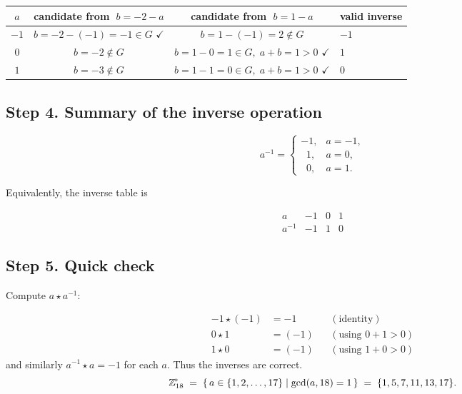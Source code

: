 \documentclass[12pt]{article}
\theoremstyle{definition} %
\theoremstyle{plain} %
\begin{document}
\begin{center}
\renewcommand{\arraystretch}{1.3}
\begin{tabular}{c|ccl}
\(a\) & candidate from \(\;b=-2-a\) &
candidate from \(\;b=1-a\) & valid inverse \\ \hline
\(-1\) & \(b=-2-(-1)=-1\in G\) \(\checkmark\) & \(b=1-(-1)=2\notin G\) & \(-1\) \\[2pt]
\(0\)  & \(b=-2\notin G\) & \(b=1-0=1\in G,\;a+b=1>0\) \(\checkmark\) & \(1\) \\[2pt]
\(1\)  & \(b=-3\notin G\) & \(b=1-1=0\in G,\;a+b=1>0\) \(\checkmark\) & \(0\)
\end{tabular}
\end{center}

\subsection*{Step 4.  Summary of the inverse operation}

\[
a^{-1}=
\begin{cases}
-1, & a=-1,\\
\;\;1, & a=0,\\
\;\;0, & a=1.
\end{cases}
\]

Equivalently, the inverse table is

\[
\begin{array}{c|ccc}
a & -1 & 0 & 1 \\ \hline
a^{-1} & -1 & 1 & 0
\end{array}
\]

\subsection*{Step 5.  Quick check}

Compute \(a\star a^{-1}\):

\[
\begin{aligned}
-1\star(-1)&=-1 &&(\text{identity})\\
0\star 1   &=(-1) &&(\text{using }0+1>0)\\
1\star 0   &=(-1) &&(\text{using }1+0>0)
\end{aligned}
\]
and similarly \(a^{-1}\star a=-1\) for each \(a\).
Thus the inverses are correct.
\[
\Bbb Z_{18}^{\!*}
   \;=\;
   \{\,a\in\{1,2,\dots,17\}\mid\gcd(a,18)=1\,\}
   \;=\;
   \{1,5,7,11,13,17\}.
\]
\end{document}
